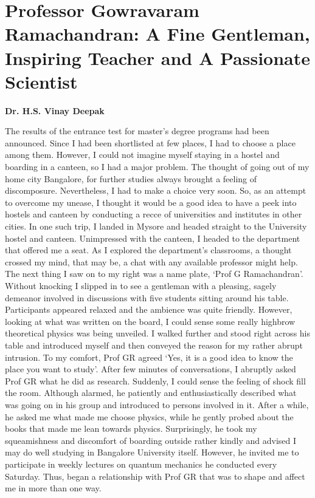 \chapter{Professor Gowravaram Ramachandran: A Fine Gentleman, Inspiring Teacher and A Passionate Scientist}\label{chap22}


\begin{center}
\textbf{Dr. H.S. Vinay Deepak}\\
\end{center}


The results of the entrance test for master's degree programs had been announced.
Since I had been shortlisted at few places, I had to choose a place among them.
However, I could not imagine myself staying in a hostel and boarding in a
canteen, so I had a major problem. The thought of going out of my home city
Bangalore, for further studies always brought a feeling of discomposure.
Nevertheless, I had to make a choice very soon. So, as an attempt to overcome
my unease, I thought it would be a good idea to have a peek into hostels and
canteen by conducting a recce of universities and institutes in other cities. In one
such trip, I landed in Mysore and headed straight to the University hostel and
canteen. Unimpressed with the canteen, I headed to the department that offered
me a seat. As I explored the department's classrooms, a thought crossed my mind,
that may be, a chat with any available professor might help. The next thing I saw
on to my right was a name plate, `Prof G Ramachandran'. Without knocking I
slipped in to see a gentleman with a pleasing, sagely demeanor involved in
discussions with five students sitting around his table. Participants appeared
relaxed and the ambience was quite friendly. However, looking at what was
written on the board, I could sense some really highbrow theoretical physics was
being unveiled. I walked further and stood right across his table and introduced
myself and then conveyed the reason for my rather abrupt intrusion. To my
comfort, Prof GR agreed `Yes, it is a good idea to know the place you want to
study'. After few minutes of conversations, I abruptly asked Prof GR what he did
as research. Suddenly, I could sense the feeling of shock fill the room. Although
alarmed, he patiently and enthusiastically described what was going on in his
group and introduced to persons involved in it. After a while, he asked me what
made me choose physics, while he gently probed about the books that made me 
lean towards physics. Surprisingly, he took my squeamishness and discomfort of
boarding outside rather kindly and advised I may do well studying in Bangalore
University itself. However, he invited me to participate in weekly lectures on
quantum mechanics he conducted every Saturday. Thus, began a relationship
with Prof GR that was to shape and affect me in more than one way.

